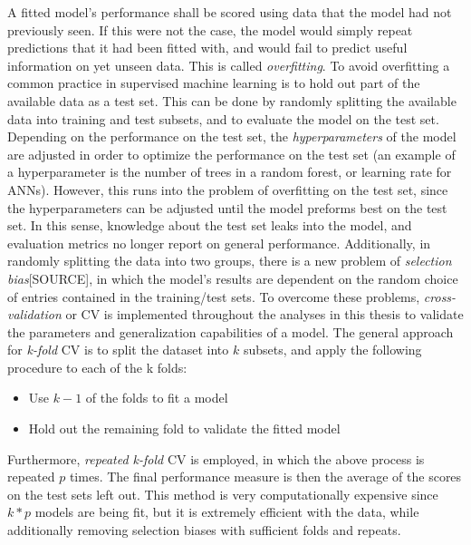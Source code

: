 \documentclass[a4paper, twoside, final, 12pt]{article}
\begin{document}
A fitted model's performance shall be scored using data that the model had not previously seen.
If this were not the case, the model would simply repeat predictions that  it had been fitted with, and would fail to predict useful information on yet unseen data.
This is called \textit{overfitting}. To avoid overfitting a common practice in supervised machine learning is to hold out part of the available data as a test set.
This can be done by randomly splitting the available data into training and test subsets, and to evaluate the model on the test set.
Depending on the performance on the test set, the \textit{hyperparameters} of the model are adjusted in order to optimize the performance on the test set  (an example of a hyperparameter is the number of trees in a random forest, or learning rate for ANNs).
However, this runs into the problem of overfitting on the test set, since the hyperparameters can be adjusted until the model preforms best on the test set.
In this sense, knowledge about the test set leaks into the model, and evaluation metrics no longer report on general performance.
Additionally, in randomly splitting the data into two groups, there is a new problem of \textit{selection bias}[SOURCE], in which the model's results are dependent on the random choice of entries contained in the training/test sets.
To overcome these problems, \textit{cross-validation} or CV is implemented throughout the analyses in this thesis to validate the parameters and generalization capabilities of a model.
The general approach for \textit{k-fold} CV is to split the dataset into $k$ subsets, and apply the following procedure to each of the k folds:
\begin{itemize}
	\item Use $k-1$ of the folds to fit a model 
	\item Hold out the remaining fold to validate the fitted model
\end{itemize}
Furthermore, \textit{repeated k-fold} CV is employed, in which the above process is repeated $p$ times.
The final performance measure is then the average of the scores on the test sets left out.
This method is very computationally expensive since $k*p$ models are being fit, but it is extremely efficient with the data, while additionally removing selection biases with sufficient folds and repeats.
\end{document}
